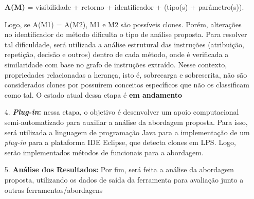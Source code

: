 \begin{itemize}
	\begin{center}
		\textbf{A(M)} = visibilidade + retorno + identificador + (tipo(s) + parâmetro(s)).
	\end{center}
	
	Logo, se A(M1) = A(M2), M1 e M2 são possíveis clones. Porém, alterações no identificador do método dificulta o tipo de análise proposta. Para resolver tal dificuldade, será utilizada a análise estrutural das instruções (atribuição, repetição, decisão e outros) dentro de cada método, onde é verificada a similaridade com base no grafo de instruções extraído. Nesse contexto, propriedades relacionadas a herança, isto é, sobrecarga e sobrescrita, não são considerados clones por possuírem conceitos específicos que não os classificam como tal.
	O estado atual dessa etapa é \textbf{em andamento}

	\item[4.] \textbf{\textit{Plug-in}:} nessa etapa, o objetivo é desenvolver um apoio computacional semi-automatizado para auxiliar a análise da abordagem proposta. Para isso, será utilizada a linguagem de programação Java para a implementação de um \textit{plug-in} para a plataforma IDE Eclipse, que detecta clones em LPS. Logo, serão implementados métodos de funcionais para a abordagem.
	
	\item[5.] \textbf{Análise dos Resultados:} Por fim, será feita a análise da abordagem proposta, utilizando os dados de saída da ferramenta para avaliação junto a outras ferramentas/abordagens
	
\end{itemize}





